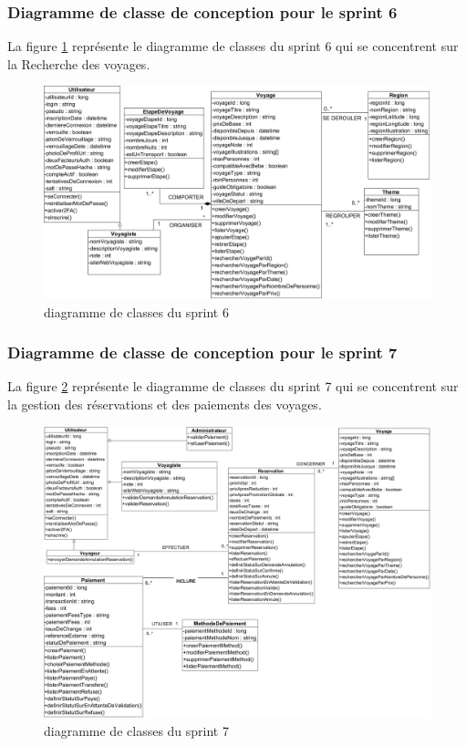 \documentclass[12pt]{report}
\begin{document}
			\subsubsection{Diagramme de classe de conception pour le sprint 6}
				
			\hspace{15pt} La figure \ref{fig:sprint6} représente le diagramme de classes du sprint 6 qui se concentrent sur la Recherche des
voyages.


			\begin{figure}[h]
				\centering
				\includegraphics[width=\textwidth]{sprint6.jpg}
				\caption{diagramme de classes du sprint 6}
				\label{fig:sprint6}
			\end{figure}
			\FloatBarrier

			\subsubsection{Diagramme de classe de conception pour le sprint 7}
				
			\hspace{15pt} La figure \ref{fig:sprint7} représente le diagramme de classes du sprint 7 qui se concentrent sur la gestion des réservations et des paiements des voyages.


			\begin{figure}[h]
				\centering
				\includegraphics[width=\textwidth]{sprint7.jpg}
				\caption{diagramme de classes du sprint 7}
				\label{fig:sprint7}
			\end{figure}
			\FloatBarrier
\end{document}
